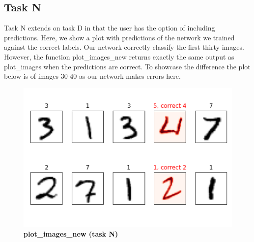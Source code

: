 \documentclass[letterpaper, 12 pt, conference]{ieeeconf}
\begin{document}
\newpage
\subsection{Task N}

Task N extends on task D in that the user has the 
option of including predictions. Here, we show a 
plot with predictions of the network we trained
against the correct labels. Our network correctly
classify the first thirty images. However, 
the function plot\_images\_new
returns exactly the same output as plot\_images when
the predictions are correct. To showcase the
difference the plot below is of images 30-40
as our network makes errors here. 

\begin{figure}[h]
\caption{\textbf{plot\_images\_new (task N)}}
\centering
\includegraphics[scale=0.4]{"../images/appendix_plot_images_new_predictions"}
\end{figure}
\end{document}
